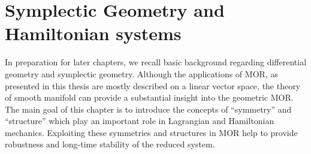 \chapter{Symplectic Geometry and Hamiltonian systems} \label{chapter:2}

In preparation for later chapters, we recall basic background regarding differential geometry and symplectic geometry. Although the applications of MOR, as presented in this thesis are mostly described on a linear vector space, the theory of smooth manifold can provide a substantial insight into the geometric MOR. The main goal of this chapter is to introduce the concepts of ``symmetry'' and ``structure'' which play an important role in Lagrangian and Hamiltonian mechanics. Exploiting these symmetries and structures in MOR help to provide robustness and long-time stability of the reduced system.


